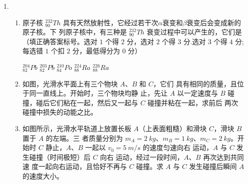 \begin{enumerate}
\item 
{}
\begin{enumerate}
	\item
原子核 $ ^{232}_{90} Th $ 具有天然放射性，它经过若干次$ \alpha $衰变和$ \beta $衰变后会变成新的原子核。下
列原子核中，有三种是 $ ^{232}_{90} Th $ 衰变过程中可以产生的，它们是
 \underlinegap 
（填正确答案标号。选对 $ 1 $ 个得 $ 2 $
分，选对 $ 2 $ 个得 $ 3 $ 分.选对 $ 3 $ 个得 $ 4 $ 分;每选错 $ 1 $ 个扣 $ 2 $ 分，最低得分为 $ 0 $ 分）




\fivechoices
{${ }_{82}^{204} Pb$}
{${ }_{82}^{203} Pb$}
{${ }_{84}^{210} Po$}
{${ }_{88}^{224} Ra$}
{${ }_{88}^{226} Ra$}




\item 
如图，光滑水平面上有三个物块 $ A $、$ B $ 和 $ C $，它们
具有相同的质量，且位于同一直线上。开始时，三个物块均静
止，先让 $ A $ 以一定速度与 $ B $ 碰撞，碰后它们粘在一起，然后又一起与 $ C $ 碰撞并粘在一起，求前后
两次碰撞中损失的动能之比。
\begin{figure}[h!]
	\flushright
	
\end{figure}





\item 
如图所示，光滑水平轨道上放置长板 $ A $（上表面粗糙）和滑块 $ C $，滑块 $ B $ 置于 $ A $ 的左端。三
者质量分别为 $ m_{A} =2 \ kg $、$ m_{B} =1 \ kg $、$ m_{C} =2 \ kg $。开始时 $ C $ 静止，$ A $、$ B $ 一起以 $ v_{0} =5 \ m /s $ 的速度匀速向右
运动，$ A $ 与 $ C $ 发生碰撞（时间极短）后 $ C $ 向右
运动，经过一段时间，$ A $、$ B $ 再次达到共同速
度一起向右运动，且恰好不再与 $ C $ 碰撞。求 $ A $
与 $ C $ 发生碰撞后瞬间 $ A $ 的速度大小。
\begin{figure}[h!]
	\flushright
	
\end{figure}


\end{enumerate}



\end{enumerate}

